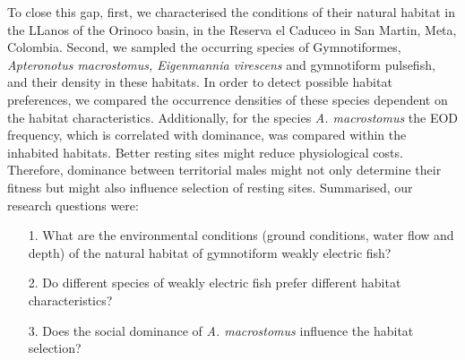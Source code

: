 To close this gap, first, we characterised the conditions of their natural habitat in the LLanos of the Orinoco basin, in the Reserva el Caduceo in San Martin, Meta, Colombia. 
Second, we sampled the occurring species of Gymnotiformes, \textit{Apteronotus macrostomus, Eigenmannia virescens} and gymnotiform pulsefish, and their density in these habitats.
In order to detect possible habitat preferences, we compared the occurrence densities of these species dependent on the habitat characteristics.
Additionally, for the species \textit{A. macrostomus} the EOD frequency, which is correlated with dominance, was compared within the inhabited habitats. 
Better resting sites might reduce physiological costs. Therefore, dominance between territorial males might not only determine their fitness but might also influence selection of resting sites.
Summarised, our research questions were:\\

\begin{itemize}
\item[1.] What are the environmental conditions (ground conditions, water flow and depth) of the natural habitat of gymnotiform weakly electric fish?

\item[2.] Do different species of weakly electric fish prefer different habitat characteristics?

\item[3.] Does the social dominance of \textit{A. macrostomus} influence the habitat selection?
\end{itemize}{}

